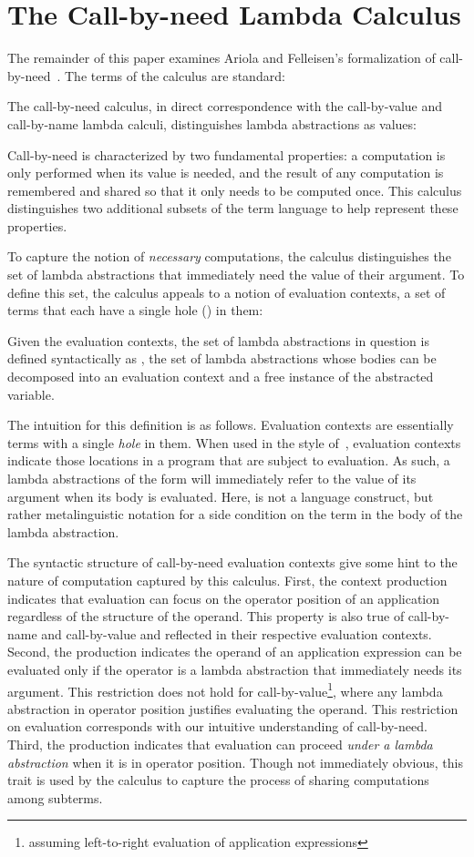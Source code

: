 \documentclass{LMCS}
\theoremstyle{plain}
\theoremstyle{remark}
\begin{document}
\section{The Call-by-need Lambda Calculus}

The remainder of this paper examines Ariola and Felleisen's formalization of
call-by-need~\cite{ariola97need}.  The terms of the calculus are standard:

The call-by-need calculus, in direct correspondence with the call-by-value and
call-by-name lambda calculi, distinguishes lambda abstractions as values:

Call-by-need is characterized by two fundamental properties: a computation is
only performed when its value is needed, and the result of any computation is
remembered and shared so that it only needs to be computed once.  This calculus
distinguishes two additional subsets of the term language to help represent
these properties.

To capture the notion of \emph{necessary} computations, the calculus
distinguishes the set of lambda abstractions that immediately need the value
of their argument.  To define this set, the calculus appeals to a notion of
evaluation contexts, a set of terms that each have a single hole () in
them:

Given the evaluation contexts, the set of lambda abstractions in question is
defined syntactically as , the set of lambda
abstractions whose bodies can be decomposed into an evaluation context and a
free instance of the abstracted variable.

The intuition for this definition is as follows.  Evaluation contexts are
essentially terms with a single \emph{hole} in them.  When used in the style
of~\citet{felleisen92revised}, evaluation contexts indicate those locations in
a program that are subject to evaluation. As such, a lambda abstractions of the
form  will immediately refer to the value of its argument
when its body is evaluated.  Here,  is not a language construct, but
rather metalinguistic notation for a side condition on the term in the body of
the lambda abstraction.

The syntactic structure of call-by-need evaluation contexts give some hint to
the nature of computation captured by this calculus.  First, the context
production  indicates that evaluation can focus on the operator position
of an application regardless of the structure of the operand.  This property is
also true of call-by-name and call-by-value and reflected in their respective
evaluation contexts.  Second, the  production indicates
the operand of an application expression can be evaluated only if the operator
is a lambda abstraction that immediately needs its argument.  This restriction
does not hold for call-by-value\footnote{assuming left-to-right evaluation of
  application expressions}, where any lambda abstraction in operator position
justifies evaluating the operand.  This restriction on evaluation corresponds
with our intuitive understanding of call-by-need.  Third, the  production indicates that evaluation can proceed \emph{under a lambda
  abstraction} when it is in operator position.  Though not immediately
obvious, this trait is used by the calculus to capture the process of sharing
computations among subterms.
\end{document}

